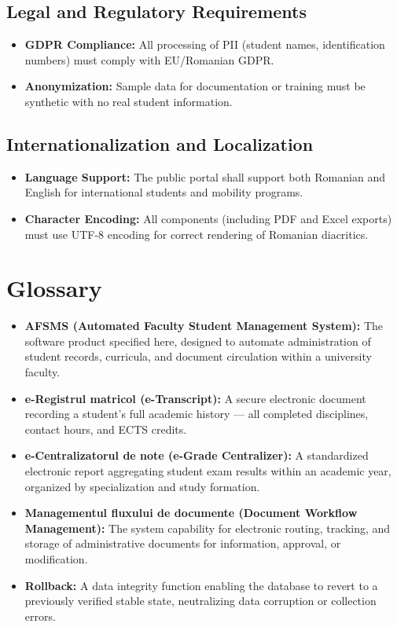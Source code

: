 \documentclass[11pt, a4paper]{article}
\begin{document}
\subsection{Legal and Regulatory Requirements}
\begin{itemize}
    \item \textbf{GDPR Compliance:} All processing of PII (student names, identification numbers) must comply with EU/Romanian GDPR.
    \item \textbf{Anonymization:} Sample data for documentation or training must be synthetic with no real student information.
\end{itemize}

\subsection{Internationalization and Localization}
\begin{itemize}
    \item \textbf{Language Support:} The public portal shall support both Romanian and English for international students and mobility programs.
    \item \textbf{Character Encoding:} All components (including PDF and Excel exports) must use UTF-8 encoding for correct rendering of Romanian diacritics.
\end{itemize}

\newpage
\appendix

\section{Glossary}
\begin{itemize}
    \item \textbf{AFSMS (Automated Faculty Student Management System):} The software product specified here, designed to automate administration of student records, curricula, and document circulation within a university faculty.
    \item \textbf{e-Registrul matricol (e-Transcript):} A secure electronic document recording a student's full academic history --- all completed disciplines, contact hours, and ECTS credits.
    \item \textbf{e-Centralizatorul de note (e-Grade Centralizer):} A standardized electronic report aggregating student exam results within an academic year, organized by specialization and study formation.
    \item \textbf{Managementul fluxului de documente (Document Workflow Management):} The system capability for electronic routing, tracking, and storage of administrative documents for information, approval, or modification.
    \item \textbf{Rollback:} A data integrity function enabling the database to revert to a previously verified stable state, neutralizing data corruption or collection errors.
\end{itemize}
\end{document}
